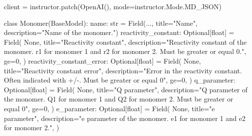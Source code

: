 \documentclass[
  letterpaper,
  DIV=11,
  numbers=noendperiod]{scrreprt}
\newenvironment{Shaded}{\begin{snugshade}}{\end{snugshade}}
\newcommand{\BuiltInTok}[1]{\textcolor[rgb]{0.00,0.23,0.31}{#1}}
\newcommand{\DecValTok}[1]{\textcolor[rgb]{0.68,0.00,0.00}{#1}}
\newcommand{\KeywordTok}[1]{\textcolor[rgb]{0.00,0.23,0.31}{#1}}
\newcommand{\NormalTok}[1]{\textcolor[rgb]{0.00,0.23,0.31}{#1}}
\newcommand{\OperatorTok}[1]{\textcolor[rgb]{0.37,0.37,0.37}{#1}}
\newcommand{\StringTok}[1]{\textcolor[rgb]{0.13,0.47,0.30}{#1}}
\newcommand{\VariableTok}[1]{\textcolor[rgb]{0.07,0.07,0.07}{#1}}
\begin{document}
\begin{Shaded}
\begin{Highlighting}[]
\NormalTok{client }\OperatorTok{=}\NormalTok{ instructor.patch(OpenAI(), mode}\OperatorTok{=}\NormalTok{instructor.Mode.MD\_JSON)}


\KeywordTok{class}\NormalTok{ Monomer(BaseModel):}
\NormalTok{    name: }\BuiltInTok{str} \OperatorTok{=}\NormalTok{ Field(..., title}\OperatorTok{=}\StringTok{"Name"}\NormalTok{, description}\OperatorTok{=}\StringTok{"Name of the monomer."}\NormalTok{)}
\NormalTok{    reactivity\_constant: Optional[}\BuiltInTok{float}\NormalTok{] }\OperatorTok{=}\NormalTok{ Field(}
        \VariableTok{None}\NormalTok{,}
\NormalTok{        title}\OperatorTok{=}\StringTok{"Reactivity constant"}\NormalTok{,}
\NormalTok{        description}\OperatorTok{=}\StringTok{"Reactivity constant of the monomer. r1 for monomer 1 and r2 for monomer 2. Must be greater or equal 0."}\NormalTok{,}
\NormalTok{        ge}\OperatorTok{=}\DecValTok{0}\NormalTok{,}
\NormalTok{    )}
\NormalTok{    reactivity\_constant\_error: Optional[}\BuiltInTok{float}\NormalTok{] }\OperatorTok{=}\NormalTok{ Field(}
        \VariableTok{None}\NormalTok{,}
\NormalTok{        title}\OperatorTok{=}\StringTok{"Reactivity constant error"}\NormalTok{,}
\NormalTok{        description}\OperatorTok{=}\StringTok{"Error in the reactivity constant. Often indicated with +/{-}. Must be greater or equal 0"}\NormalTok{,}
\NormalTok{        ge}\OperatorTok{=}\DecValTok{0}\NormalTok{,}
\NormalTok{    )}
\NormalTok{    q\_parameter: Optional[}\BuiltInTok{float}\NormalTok{] }\OperatorTok{=}\NormalTok{ Field(}
        \VariableTok{None}\NormalTok{,}
\NormalTok{        title}\OperatorTok{=}\StringTok{"Q parameter"}\NormalTok{,}
\NormalTok{        description}\OperatorTok{=}\StringTok{"Q parameter of the monomer. Q1 for monomer 1 and Q2 for monomer 2. Must be greater or equal 0"}\NormalTok{,}
\NormalTok{        ge}\OperatorTok{=}\DecValTok{0}\NormalTok{,}
\NormalTok{    )}
\NormalTok{    e\_parameter: Optional[}\BuiltInTok{float}\NormalTok{] }\OperatorTok{=}\NormalTok{ Field(}
        \VariableTok{None}\NormalTok{,}
\NormalTok{        title}\OperatorTok{=}\StringTok{"e parameter"}\NormalTok{,}
\NormalTok{        description}\OperatorTok{=}\StringTok{"e parameter of the monomer. e1 for monomer 1 and e2 for monomer 2."}\NormalTok{,}
\NormalTok{    )}



\end{Highlighting}
\end{Shaded}
\end{document}
